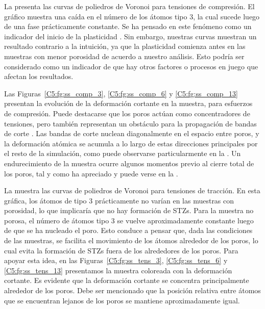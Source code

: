 La  presenta las curvas de poliedros de Voronoi para tensiones de compresión. El gráfico muestra una caída en el número de los átomos tipo 3, la cual sucede luego de una fase prácticamente constante. Se ha pensado en este fenómeno como un indicador del inicio de la plasticidad \citep{arman10}. Sin embargo, nuestras curvas muestran un resultado contrario a la intuición, ya que la plasticidad comienza antes en las muestras con menor porosidad de acuerdo a nuestro análisis. Esto podría ser considerado como un indicador de que hay otros factores o procesos en juego que afectan los resultados.

Las Figuras~\ref{C5:fg:ss_comp_3}, \ref{C5:fg:ss_comp_6} y \ref{C5:fg:ss_comp_13} presentan la evolución de la deformación cortante en la muestra, para esfuerzos de compresión. Puede destacarse que los poros actúan como concentradores de tensiones, pero también representan un obstáculo para la propagación de bandas de corte \citep{wang10}. Las bandas de corte nuclean diagonalmente en el espacio entre poros, y la deformación atómica se acumula a lo largo de estas direcciones principales por el resto de la simulación, como puede observarse particularmente en la . Un endurecimiento de la muestra ocurre algunos momentos previo al cierre total de los poros, tal y como ha apreciado \cite{yuan14} y puede verse en la .

La  muestra las curvas de poliedros de Voronoi para tensiones de tracción. En esta gráfica, los átomos de tipo 3
prácticamente no varían en las muestras con porosidad, lo que implicaría que no hay formación de STZs. Para la muestra no porosa, el número de átomos tipo 3 se vuelve aproximadamente constante luego de que se ha nucleado el poro. Esto conduce a pensar que, dada las condiciones de las muestras, se facilita el movimiento de los átomos alrededor de los poros, lo cual evita la formación de STZs fuera de los alrededores de los poros. Para apoyar esta idea, en las Figuras~\ref{C5:fg:ss_tens_3}, \ref{C5:fg:ss_tens_6} y \ref{C5:fg:ss_tens_13} presentamos la muestra coloreada con la deformación cortante. Es evidente que la deformación cortante se concentra principalmente alrededor de los poros. Debe ser mencionado que la posición relativa entre átomos que se encuentran lejanos de los poros se mantiene aproximadamente igual.

